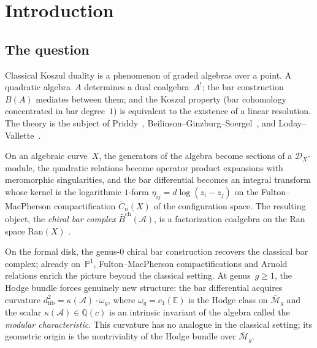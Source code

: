 \documentclass[11pt,reqno]{amsart}
\theoremstyle{definition}
\theoremstyle{remark}
\newcommand{\cA}{\mathcal{A}}
\newcommand{\cM}{\mathcal{M}}
\newcommand{\barB}{\bar{B}}
\newcommand{\Ran}{\mathrm{Ran}}
\newcommand{\FM}{\overline{C}}
\numberwithin{equation}{section}
\begin{document}
\maketitle


\section{Introduction}\label{sec:intro}

\subsection{The question}

Classical Koszul duality is a phenomenon of graded algebras
over a point. A quadratic algebra~$A$ determines a dual
coalgebra~$A^!$; the bar construction $B(A)$ mediates between
them; and the Koszul property (bar cohomology concentrated in
bar degree~$1$) is equivalent to the existence of a linear
resolution. The theory is the subject of Priddy~\cite{Priddy70},
Beilinson--Ginzburg--Soergel~\cite{BGS96}, and
Loday--Vallette~\cite{LV12}.

On an algebraic curve~$X$, the generators of the algebra become
sections of a $\mathcal{D}_X$-module, the quadratic relations
become operator product expansions with meromorphic singularities,
and the bar differential becomes an integral transform whose
kernel is the logarithmic $1$-form
$\eta_{ij} = d\log(z_i - z_j)$ on the Fulton--MacPherson
compactification $\FM_n(X)$ of the configuration space. The
resulting object, the \emph{chiral bar complex}
$\barB^{\mathrm{ch}}(\cA)$, is a factorization coalgebra on the
Ran space $\Ran(X)$ \cite{BD04, FG12, CG17}.

On the formal disk, the genus-$0$ chiral bar construction
recovers the classical bar complex; already on~$\mathbb{P}^1$,
Fulton--MacPherson compactifications and Arnold relations
enrich the picture beyond the classical setting. At
genus~$g \ge 1$, the Hodge bundle forces genuinely new
structure: the bar differential acquires curvature
$d_{\mathrm{fib}}^2 = \kappa(\cA) \cdot \omega_g$, where
$\omega_g = c_1(\mathbb{E})$ is the Hodge class on
$\overline{\cM}_g$ and the scalar
$\kappa(\cA) \in \mathbb{Q}(c)$ is an intrinsic invariant of
the algebra called the \emph{modular characteristic}. This
curvature has no analogue in the classical setting; its geometric
origin is the nontriviality of the Hodge bundle over
$\overline{\cM}_g$.
\end{document}

